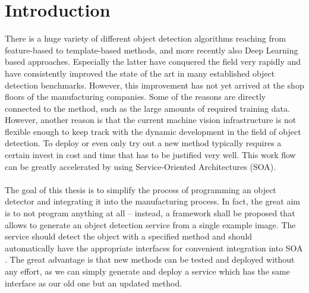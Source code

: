\chapter{Introduction\label{cha:chapter1}}
There is a huge variety of different object detection algorithms reaching from feature-based to template-based methods, and more recently also Deep Learning based approaches. Especially the latter have conquered the field very rapidly and have consistently improved the state of the art in many established object detection benchmarks. However, this improvement has not yet arrived at the shop floors of the manufacturing companies. Some of the reasons are directly connected to the method, such as the large amounts of required training data. However, another reason is that the current machine vision infrastructure is not flexible enough to keep track with the dynamic development in the field of object detection. To deploy or even only try out a new method typically requires a certain invest in cost and time that has to be justified very well. This work flow can be greatly accelerated by using Service-Oriented Architectures (SOA).
\\
\\
The goal of this thesis is to simplify the process of programming an object detector and integrating it into the manufacturing process. In fact, the great aim is to not program anything at all – instead, a framework shall be proposed that allows to generate an object detection service from a single example image.
The service should detect the object with a specified method and should automatically have the appropriate interfaces for convenient integration into SOA . The great advantage is that new methods can be tested and deployed without any effort, as we can simply generate and deploy a service which has the same interface as our old one but an updated method.
 